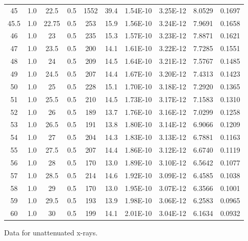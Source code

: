 \begin{maintable}[ht]
\begin{tabular}{cccccccccc}
45          & 1.0   & 22.5       & 0.5           & 1552    & 39.4       & 1.54E-10    & 3.25E-12       & 8.0529    & 0.1697       \\
45.5        & 1.0   & 22.75      & 0.5           & 253     & 15.9       & 1.56E-10    & 3.24E-12       & 7.9691    & 0.1658       \\
46          & 1.0   & 23         & 0.5           & 235     & 15.3       & 1.57E-10    & 3.23E-12       & 7.8871    & 0.1621       \\
47          & 1.0   & 23.5       & 0.5           & 200     & 14.1       & 1.61E-10    & 3.22E-12       & 7.7285    & 0.1551       \\
48          & 1.0   & 24         & 0.5           & 209     & 14.5       & 1.64E-10    & 3.21E-12       & 7.5767    & 0.1485       \\
49          & 1.0   & 24.5       & 0.5           & 207     & 14.4       & 1.67E-10    & 3.20E-12       & 7.4313    & 0.1423       \\
50          & 1.0   & 25         & 0.5           & 228     & 15.1       & 1.70E-10    & 3.18E-12       & 7.2920    & 0.1365       \\
51          & 1.0   & 25.5       & 0.5           & 210     & 14.5       & 1.73E-10    & 3.17E-12       & 7.1583    & 0.1310       \\
52          & 1.0   & 26         & 0.5           & 189     & 13.7       & 1.76E-10    & 3.16E-12       & 7.0299    & 0.1258       \\
53          & 1.0   & 26.5       & 0.5           & 191     & 13.8       & 1.80E-10    & 3.14E-12       & 6.9066    & 0.1209       \\
54          & 1.0   & 27         & 0.5           & 204     & 14.3       & 1.83E-10    & 3.13E-12       & 6.7881    & 0.1163       \\
55          & 1.0   & 27.5       & 0.5           & 207     & 14.4       & 1.86E-10    & 3.12E-12       & 6.6740    & 0.1119       \\
56          & 1.0   & 28         & 0.5           & 170     & 13.0       & 1.89E-10    & 3.10E-12       & 6.5642    & 0.1077       \\
57          & 1.0   & 28.5       & 0.5           & 214     & 14.6       & 1.92E-10    & 3.09E-12       & 6.4585    & 0.1038       \\
58          & 1.0   & 29         & 0.5           & 170     & 13.0       & 1.95E-10    & 3.07E-12       & 6.3566    & 0.1001       \\
59          & 1.0   & 29.5       & 0.5           & 193     & 13.9       & 1.98E-10    & 3.06E-12       & 6.2583    & 0.0965       \\
60          & 1.0   & 30         & 0.5           & 199     & 14.1       & 2.01E-10    & 3.04E-12       & 6.1634    & 0.0932       \\
\end{tabular}
\caption{Data for unattenuated x-rays.}
\label{tab:xrcg1}
\end{maintable}



